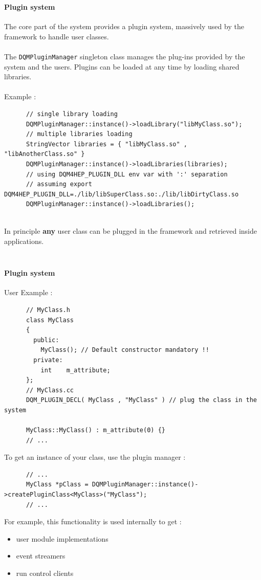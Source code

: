 \documentclass[8pt]{beamer}
\begin{document}
    \begin{frame}[containsverbatim]
      \frametitle{\secname}
      \framesubtitle{Plugin system}
      
      The core part of the system provides a plugin system, massively used by the framework to handle user classes. \\
      ~ \\
      The \verb|DQMPluginManager| singleton class manages the plug-ins provided by the system and the users. Plugins can be loaded at any time by loading shared libraries. \\
      ~ \\
      Example :
      \begin{lstlisting}
      // single library loading
      DQMPluginManager::instance()->loadLibrary("libMyClass.so"); 
      // multiple libraries loading
      StringVector libraries = { "libMyClass.so" , "libAnotherClass.so" }
      DQMPluginManager::instance()->loadLibraries(libraries); 
      // using DQM4HEP_PLUGIN_DLL env var with ':' separation
      // assuming export DQM4HEP_PLUGIN_DLL=./lib/libSuperClass.so:./lib/libDirtyClass.so
      DQMPluginManager::instance()->loadLibraries(); 
      \end{lstlisting}
      
      ~ \\
      In principle \textbf{any} user class can be plugged in the framework and retrieved inside applications. \\
      ~ \\
    \end{frame}
    
    
    \begin{frame}[containsverbatim]
      \frametitle{\secname}
      \framesubtitle{Plugin system}
      User Example :
      \begin{lstlisting}
      // MyClass.h
      class MyClass 
      {
        public:
          MyClass(); // Default constructor mandatory !!
        private:
          int    m_attribute;
      };
      // MyClass.cc
      DQM_PLUGIN_DECL( MyClass , "MyClass" ) // plug the class in the system
      
      MyClass::MyClass() : m_attribute(0) {}
      // ...
      \end{lstlisting}

      To get an instance of your class, use the plugin manager :
      \begin{lstlisting}
      // ...
      MyClass *pClass = DQMPluginManager::instance()->createPluginClass<MyClass>("MyClass");
      // ...
      \end{lstlisting}
      
      For example, this functionality is used internally to get :
      \begin{itemize}
        \item user module implementations
        \item event streamers
        \item run control clients
      \end{itemize}

    \end{frame}
    
\end{document}

